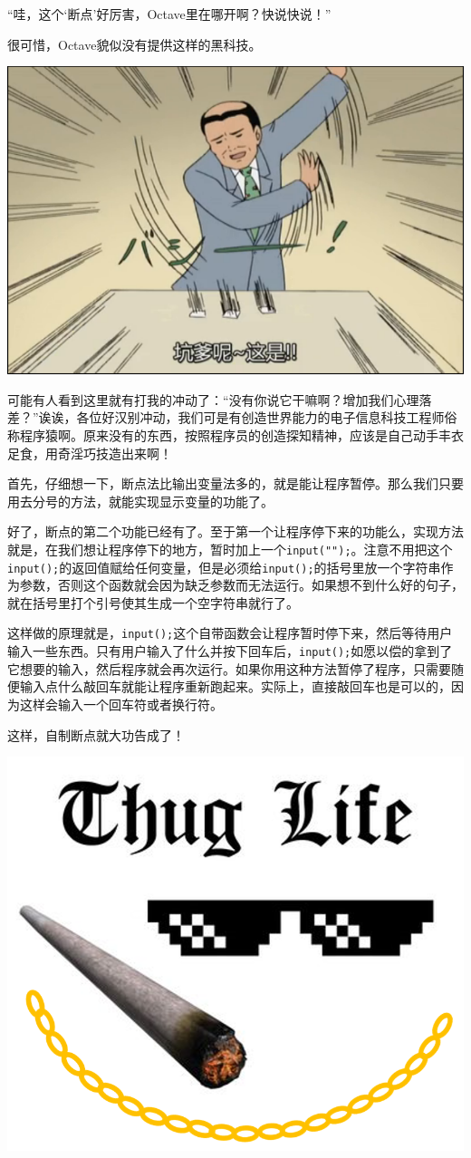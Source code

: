 \documentclass[12pt]{article}
\begin{document}
\begin{spacing}{1.4}
“哇，这个‘断点’好厉害，Octave里在哪开啊？快说快说！”

很可惜，Octave貌似没有提供这样的黑科技。

\includegraphics[width=0.5\linewidth]{whatTheHell.png}

可能有人看到这里就有打我的冲动了：“没有你说它干嘛啊？增加我们心理落差？”诶诶，各位好汉别冲动，我们可是有创造世界能力的电子信息科技工程师俗称程序猿啊。原来没有的东西，按照程序员的创造探知精神，应该是自己动手丰衣足食，用奇淫巧技造出来啊！

首先，仔细想一下，断点法比输出变量法多的，就是能让程序暂停。那么我们只要用去分号的方法，就能实现显示变量的功能了。

好了，断点的第二个功能已经有了。至于第一个让程序停下来的功能么，实现方法就是，在我们想让程序停下的地方，暂时加上一个\texttt{input("");}。注意不用把这个\texttt{input();}的返回值赋给任何变量，但是必须给\texttt{input();}的括号里放一个字符串作为参数，否则这个函数就会因为缺乏参数而无法运行。如果想不到什么好的句子，就在括号里打个引号使其生成一个空字符串就行了。

这样做的原理就是，\texttt{input();}这个自带函数会让程序暂时停下来，然后等待用户输入一些东西。只有用户输入了什么并按下回车后，\texttt{input();}如愿以偿的拿到了它想要的输入，然后程序就会再次运行。如果你用这种方法暂停了程序，只需要随便输入点什么敲回车就能让程序重新跑起来。实际上，直接敲回车也是可以的，因为这样会输入一个回车符或者换行符。

这样，自制断点就大功告成了！

\includegraphics[width=0.5\linewidth]{thugLife.png}


\end{spacing}
\end{document}
